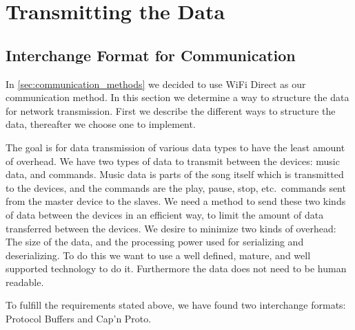 \section{Transmitting the Data}\label{sec:transmitting_the_data}

\subsection{Interchange Format for Communication}\label{sec:transmit}
In \cref{sec:communication_methods} we decided to use WiFi Direct as our communication method.
In this section we determine a way to structure the data for network transmission.
First we describe the different ways to structure the data, thereafter we choose one to implement.

\bigskip
The goal is for data transmission of various data types to have the least amount of overhead.
We have two types of data to transmit between the devices: music data, and commands.
Music data is parts of the song itself which is transmitted to the devices,
and the commands are the play, pause, stop, etc.\ commands sent from the master device to the slaves.
We need a method to send these two kinds of data between the devices in an efficient way,
to limit the amount of data transferred between the devices.
We desire to minimize two kinds of overhead: The size of the data, and the processing power used for serializing and deserializing.
To do this we want to use a well defined, mature, and well supported technology to do it.
Furthermore the data does not need to be human readable.

\bigskip
To fulfill the requirements stated above, we have found two interchange formats: Protocol Buffers and Cap'n Proto.

